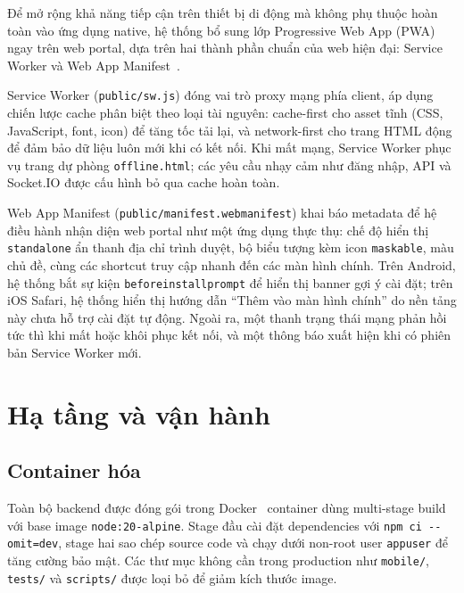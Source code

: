 \documentclass[../DoAn.tex]{subfiles}
\begin{document}
Để mở rộng khả năng tiếp cận trên thiết bị di động mà không phụ thuộc hoàn
toàn vào ứng dụng native, hệ thống bổ sung lớp Progressive Web App
(PWA)~\cite{webdev_pwa} ngay trên web portal, dựa trên hai thành phần chuẩn
của web hiện đại: Service Worker và Web App Manifest~\cite{w3c_manifest}.

Service Worker (\texttt{public/sw.js}) đóng vai trò proxy mạng phía client,
áp dụng chiến lược cache phân biệt theo loại tài nguyên: cache-first cho asset
tĩnh (CSS, JavaScript, font, icon) để tăng tốc tải lại, và network-first cho
trang HTML động để đảm bảo dữ liệu luôn mới khi có kết nối. Khi mất mạng,
Service Worker phục vụ trang dự phòng \texttt{offline.html}; các yêu cầu nhạy
cảm như đăng nhập, API và Socket.IO được cấu hình bỏ qua cache hoàn toàn.

Web App Manifest (\texttt{public/manifest.webmanifest}) khai báo metadata để
hệ điều hành nhận diện web portal như một ứng dụng thực thụ: chế độ hiển thị
\texttt{standalone} ẩn thanh địa chỉ trình duyệt, bộ biểu tượng kèm icon
\texttt{maskable}, màu chủ đề, cùng các shortcut truy cập nhanh đến các màn
hình chính. Trên Android, hệ thống bắt sự kiện \texttt{beforeinstallprompt}
để hiển thị banner gợi ý cài đặt; trên iOS Safari, hệ thống hiển thị hướng
dẫn ``Thêm vào màn hình chính'' do nền tảng này chưa hỗ trợ cài đặt tự động.
Ngoài ra, một thanh trạng thái mạng phản hồi tức thì khi mất hoặc khôi phục
kết nối, và một thông báo xuất hiện khi có phiên bản Service Worker mới.

\section{Hạ tầng và vận hành}
\label{sec:infrastructure}

\subsection*{Container hóa}

Toàn bộ backend được đóng gói trong Docker~\cite{docker_docs} container dùng
multi-stage build với base image \texttt{node:20-alpine}. Stage đầu cài đặt
dependencies với \texttt{npm ci -{}-omit=dev}, stage hai sao chép source code
và chạy dưới non-root user \texttt{appuser} để tăng cường bảo mật. Các thư
mục không cần trong production như \texttt{mobile/}, \texttt{tests/} và
\texttt{scripts/} được loại bỏ để giảm kích thước image.
\end{document}
